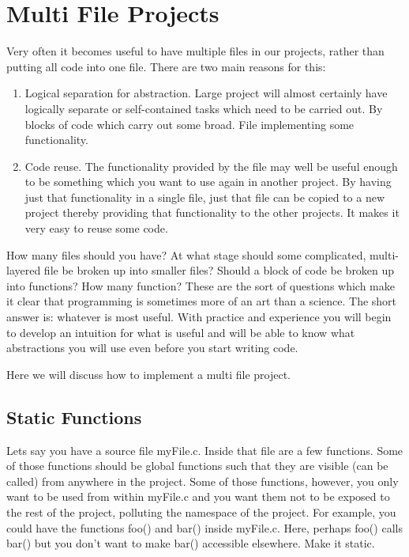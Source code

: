 \chapter{Multi File Projects}
Very often it becomes useful to have multiple files in our projects, rather than putting all code into one file.
There are two main reasons for this:
\begin{enumerate}
  \item Logical separation for abstraction. Large project will almost certainly have logically separate or self-contained tasks which need to be carried out.
    By blocks of code which carry out some broad. File implementing some functionality.
  \item Code reuse. The functionality provided by the file may well be useful enough to be something which you want to use again in another project.
    By having just that functionality in a single file, just that file can be copied to a new project thereby providing that functionality to the other projects.
    It makes it very easy to reuse some code.
\end{enumerate}
How many files should you have? At what stage should some complicated, multi-layered file be broken up into smaller files? Should a block of code be broken up into functions? How many function? These are the sort of questions which make it clear that programming is sometimes more of an art than a science. The short answer is: whatever is most useful. With practice and experience you will begin to develop an intuition for what is useful and will be able to know what abstractions you will use even before you start writing code. 

Here we will discuss how to implement a multi file project.

\section{Static Functions}
Lets say you have a source file myFile.c. Inside that file are a few functions. Some of those functions should be global functions such that they are visible (can be called) from anywhere in the project.
Some of those functions, however, you only want to be used from within myFile.c and you want them not to be exposed to the rest of the project, polluting the namespace of the project. 
For example, you could have the functions foo() and bar() inside myFile.c. Here, perhaps foo() calls bar() but you don't want to make bar() accessible elsewhere. Make it static.

